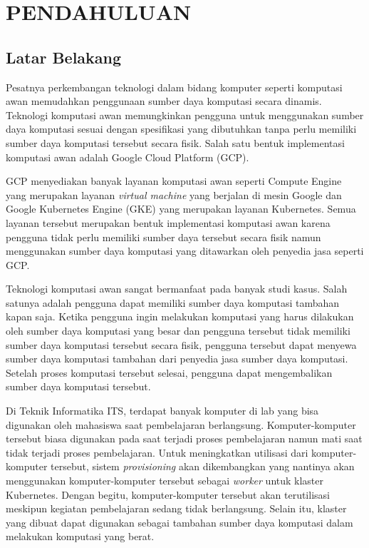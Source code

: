 \chapter{PENDAHULUAN}
\label{chap:pendahuluan}


\section{Latar Belakang}
\label{sec:latarbelakang}

Pesatnya perkembangan teknologi dalam bidang komputer
seperti komputasi awan memudahkan penggunaan sumber daya
komputasi secara dinamis. Teknologi komputasi awan memungkinkan
pengguna untuk menggunakan sumber daya komputasi sesuai dengan spesifikasi
yang dibutuhkan tanpa perlu memiliki sumber daya komputasi tersebut secara
fisik. Salah satu bentuk implementasi komputasi awan adalah
Google Cloud Platform (GCP).

GCP menyediakan banyak layanan komputasi awan seperti Compute Engine yang merupakan
layanan \emph{virtual machine} yang berjalan di mesin Google dan Google Kubernetes Engine (GKE)
yang merupakan layanan Kubernetes. Semua layanan tersebut merupakan bentuk implementasi
komputasi awan karena pengguna tidak perlu memiliki sumber daya tersebut secara
fisik namun menggunakan sumber daya komputasi yang ditawarkan oleh penyedia jasa seperti GCP.

Teknologi komputasi awan sangat bermanfaat pada banyak studi kasus. Salah satunya adalah pengguna
dapat memiliki sumber daya komputasi tambahan kapan saja. Ketika pengguna ingin melakukan komputasi
yang harus dilakukan oleh sumber daya komputasi yang besar dan pengguna tersebut tidak memiliki
sumber daya komputasi tersebut secara fisik, pengguna tersebut dapat menyewa sumber daya komputasi
tambahan dari penyedia jasa sumber daya komputasi. Setelah proses komputasi tersebut selesai, pengguna
dapat mengembalikan sumber daya komputasi tersebut.

Di Teknik Informatika ITS, terdapat banyak komputer di lab yang bisa digunakan oleh mahasiswa saat
pembelajaran berlangsung. Komputer-komputer tersebut biasa digunakan pada saat terjadi proses pembelajaran
namun mati saat tidak terjadi proses pembelajaran. Untuk meningkatkan utilisasi dari komputer-komputer tersebut,
sistem \emph{provisioning} akan dikembangkan yang nantinya akan menggunakan komputer-komputer tersebut sebagai
\emph{worker} untuk klaster Kubernetes. Dengan begitu, komputer-komputer tersebut akan terutilisasi
meskipun kegiatan pembelajaran sedang tidak berlangsung. Selain itu, klaster yang dibuat
dapat digunakan sebagai tambahan sumber daya komputasi dalam melakukan komputasi yang berat.

